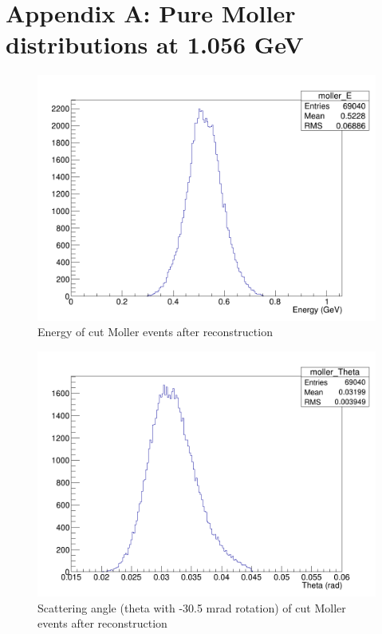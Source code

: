 \documentclass{article}
\begin{document}
	\section{Appendix A: Pure Moller distributions at 1.056 GeV}
	
	\begin{figure}[H]
  	\includegraphics[width=\linewidth]{PostCollabMeet/Pass3PureMoller/CUT_moller_E.png}
  	\caption{Energy of cut Moller events after reconstruction}
  	\label{fig:cutE}
	\end{figure}
	
	\begin{figure}[H]
  	\includegraphics[width=\linewidth]{PostCollabMeet/Pass3PureMoller/CUT_moller_Theta.png}
  	\caption{Scattering angle (theta with -30.5 mrad rotation) of cut Moller events after reconstruction}
  	\label{fig:cutT}
	\end{figure}
	
\end{document}
